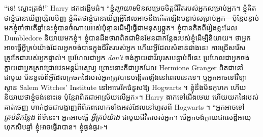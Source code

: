 “ទេ! ស្មោះត្រង់!” Harry ដកដង្ហើមធំ។ “ខ្ញុំ\emph{ព្យាយាម}មិនសម្រេចចិត្តជីវិតរបស់អ្នកសម្រាប់អ្នក។ ខ្ញុំ​គិត​ថា​ខ្ញុំ​បាន​ឃើញ​ម្សិលមិញ ខ្ញុំ​គិត​ថា​ខ្ញុំ​បាន​ឃើញ​អ្វី​ដែល​អាច​នឹង​កើត​ឡើង​បន្ទាប់​សម្រាប់​អ្នក—ប៉ុន្តែ​បន្ទាប់​មក​ខ្ញុំ​ចាំ​ថា​តើ​ឆ្នាំ​នេះ​ខ្ញុំ​បាន​ចំណាយ​អស់​ប៉ុន្មាន​ដើម្បី​ធ្វើ​ជា​មនុស្ស​ឆ្កួត​។ ខ្ញុំបានគិតពីរឿងខ្លះដែល Dumbledore និយាយមកខ្ញុំ។ ខ្ញុំ​បាន​ដឹង​ថា​វា​ពិត​ជា​មិន​មែន​ជា​កន្លែង​របស់​ខ្ញុំ​ដើម្បី​និយាយ​។ ថាអ្នកអាចធ្វើអ្វីគ្រប់យ៉ាងដែលអ្នកចង់បានក្នុងជីវិតរបស់អ្នក ហើយអ្វីដែលសំខាន់ជាងនេះ ការជ្រើសរើសត្រូវតែជារបស់អ្នកផ្ទាល់។ ប្រហែលជាអ្នក \emph{ don't} ចង់ក្លាយជាវីរបុរសបន្ទាប់ពីនេះ ប្រហែលជាអ្នកចង់ក្លាយជាអ្នកស្រាវជ្រាវវេទមន្តដ៏អស្ចារ្យ ព្រោះនោះគឺជាអ្នកដែល Hermione Granger ពិតជានៅជាមួយ មិនខ្វល់ពីអ្វីដែលក្រចកដៃរបស់អ្នកត្រូវបានបង្កើតឡើងនៅពេលនេះទេ។ ឬអ្នកអាចទៅវិទ្យាស្ថាន Salem Witches' Institute នៅអាមេរិកជំនួសឱ្យ Hogwarts ។ ខ្ញុំ​នឹង​មិន​កុហក ហើយ​និយាយ​ថា​ខ្ញុំ​ចង់​នោះ​ទេ ប៉ុន្តែ​វា​ពិត​ជា​អាស្រ័យ​លើ​អ្នក»។ Harry ងាកទៅជើងមេឃ ហើយយកដៃរបស់គាត់ចេញ ហាក់ដូចជាបង្ហាញពីពិភពលោកទាំងអស់ដែលនៅហួសពី Hogwarts ។ “អ្នកអាចទៅ \emph{គ្រប់ទីកន្លែង} ពីទីនេះ។ អ្នកអាចធ្វើ \emph{អ្វីគ្រប់យ៉ាង} ជាមួយជីវិតរបស់អ្នក។ បើ​អ្នក​ចង់​ក្លាយ​ជា​សេដ្ឋី​អាយុ​ហុកសិប​ឆ្នាំ ខ្ញុំ​អាច​ធ្វើ​វា​បាន។ ខ្ញុំ​ធ្ងន់ធ្ងរ»។

